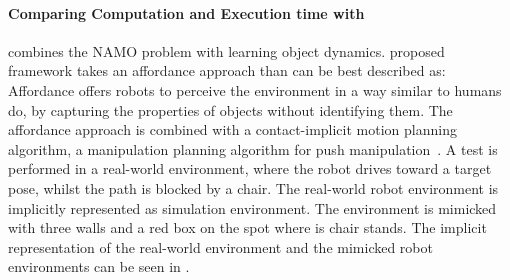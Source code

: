 \paragraph{Comparing Computation and Execution time with \citeauthor{wang_affordancebased_2020}}
\citeauthor{wang_affordancebased_2020} combines the \ac{NAMO} problem with learning object dynamics. \citeauthor{wang_affordancebased_2020} proposed framework takes an affordance approach than can be best described as: Affordance offers robots to perceive the environment in a way similar to humans do, by capturing the properties of objects without identifying them. The affordance approach is combined with a contact-implicit motion planning algorithm, a manipulation planning algorithm for push manipulation~\cite{wang_affordancebased_2020}. A test is performed in a real-world environment, where the robot drives toward a target pose, whilst the path is blocked by a chair. The real-world robot environment is implicitly represented as simulation environment. The environment is mimicked with three walls and a red box on the spot where is chair stands. The implicit representation of the real-world environment and the mimicked robot environments can be seen in .\bs

